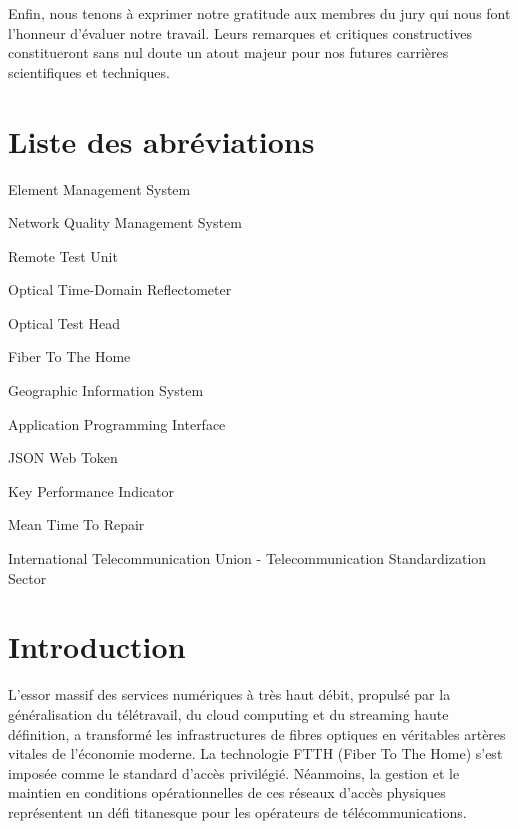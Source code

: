 \documentclass[11pt,a4paper]{article}
\begin{document}
Enfin, nous tenons à exprimer notre gratitude aux membres du jury qui nous font l'honneur d'évaluer notre travail. Leurs remarques et critiques constructives constitueront sans nul doute un atout majeur pour nos futures carrières scientifiques et techniques.

\newpage

\renewcommand{\contentsname}{Table des matières}
\tableofcontents
{}

\newpage
\section*{Liste des abréviations}

\begin{description}[leftmargin=2.5cm, style=nextline]
    \item[EMS] Element Management System
    \item[NQMS] Network Quality Management System
    \item[RTU] Remote Test Unit
    \item[OTDR] Optical Time-Domain Reflectometer
    \item[OTH] Optical Test Head
    \item[FTTH] Fiber To The Home
    \item[GIS] Geographic Information System
    \item[API] Application Programming Interface
    \item[JWT] JSON Web Token
    \item[KPI] Key Performance Indicator
    \item[MTTR] Mean Time To Repair
    \item[ITU-T] International Telecommunication Union - Telecommunication Standardization Sector
\end{description}

\newpage
{}
\setcounter{page}{1}

\section{Introduction}
L'essor massif des services numériques à très haut débit, propulsé par la généralisation du télétravail, du cloud computing et du streaming haute définition, a transformé les infrastructures de fibres optiques en véritables artères vitales de l'économie moderne. La technologie FTTH (Fiber To The Home) s'est imposée comme le standard d'accès privilégié. Néanmoins, la gestion et le maintien en conditions opérationnelles de ces réseaux d'accès physiques représentent un défi titanesque pour les opérateurs de télécommunications.
\end{document}
